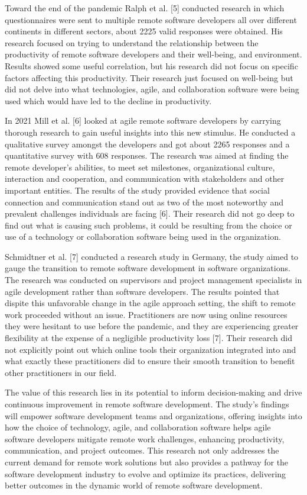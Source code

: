 \documentclass[conference]{IEEEtran}
\begin{document}
Toward the end of the pandemic Ralph et al. [5] conducted research in which questionnaires were sent to multiple remote software developers all over different continents in different sectors, about 2225 valid responses were obtained. His research focused on trying to understand the relationship between the productivity of remote software developers and their well-being, and environment. Results showed some useful correlation, but his research did not focus on specific factors affecting this productivity. Their research just focused on well-being but did not delve into what technologies, agile, and collaboration software were being used which would have led to the decline in productivity. 

In 2021 Mill et al. [6] looked at agile remote software developers by carrying thorough research to gain useful insights into this new stimulus. He conducted a qualitative survey amongst the developers and got about 2265 responses and a quantitative survey with 608 responses. The research was aimed at finding the remote developer’s abilities, to meet set milestones, organizational culture, interaction and cooperation, and communication with stakeholders and other important entities. The results of the study provided evidence that social connection and communication stand out as two of the most noteworthy and prevalent challenges individuals are facing [6]. Their research did not go deep to find out what is causing such problems, it could be resulting from the choice or use of a technology or collaboration software being used in the organization. 

Schmidtner et al. [7] conducted a research study in Germany, the study aimed to gauge the transition to remote software development in software organizations. The research was conducted on supervisors and project management specialists in agile development rather than software developers. The results pointed that dispite this unfavorable change in the agile approach setting, the shift to remote work proceeded without an issue. Practitioners are now using online resources they were hesitant to use before the pandemic, and they are experiencing greater flexibility at the expense of a negligible productivity loss [7]. Their research did not explicitly point out which online tools their organization integrated into and what exactly these practitioners did to ensure their smooth transition to benefit other practitioners in our field.

The value of this research lies in its potential to inform decision-making and drive continuous improvement in remote software development. The study's findings will empower software development teams and organizations, offering insights into how the choice of technology, agile, and collaboration software helps agile software developers mitigate remote work challenges, enhancing productivity, communication, and project outcomes. This research not only addresses the current demand for remote work solutions but also provides a pathway for the software development industry to evolve and optimize its practices, delivering better outcomes in the dynamic world of remote software development.
\end{document}
